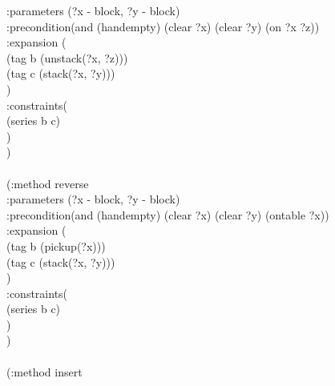 \begin{appendix}
\hspace*{2cm}  :parameters  (?x - block, ?y - block)\\
\hspace*{2cm}  :precondition(and (handempty) (clear ?x) (clear ?y) (on ?x ?z))\\
\hspace*{2cm}  :expansion  (\\
\hspace*{2.5cm}        (tag b (unstack(?x, ?z)))\\
\hspace*{2.5cm}        (tag c (stack(?x, ?y)))\\
\hspace*{2cm}  )\\
\hspace*{2cm}  :constraints(\\
\hspace*{2.5cm}        (series b c)\\
\hspace*{2cm}  )\\
\hspace*{1.5cm})
\\
\\ \hspace*{1.5cm}(:method reverse\\
\hspace*{2cm}  :parameters  (?x - block, ?y - block)\\
\hspace*{2cm}  :precondition(and (handempty) (clear ?x) (clear ?y) (ontable ?x))\\
\hspace*{2cm}  :expansion  (\\
\hspace*{2.5cm}        (tag b (pickup(?x)))\\
\hspace*{2.5cm}        (tag c (stack(?x, ?y)))\\
\hspace*{2cm}  )\\
\hspace*{2cm}  :constraints(\\
\hspace*{2.5cm}        (series b c)\\
\hspace*{2cm}  )\\
\hspace*{1.5cm})
\\
\\ \hspace*{1.5cm}(:method insert\\

\end{appendix}
